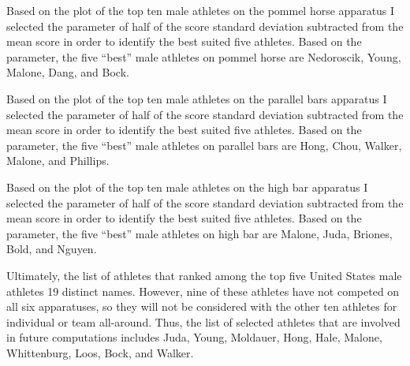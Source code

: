 \documentclass[12pt]{article}
\begin{document}
Based on the plot of the top ten male athletes on the pommel horse apparatus I selected the parameter of 
half of the score standard deviation subtracted from the mean score in order to identify the best suited five 
athletes. Based on the parameter, the five ``best'' male athletes on pommel horse are Nedoroscik, Young, Malone, 
Dang, and Bock.

Based on the plot of the top ten male athletes on the parallel bars apparatus I selected the parameter of 
half of the score standard deviation subtracted from the mean score in order to identify the best suited five 
athletes. Based on the parameter, the five ``best'' male athletes on parallel bars are Hong, Chou, Walker, Malone, 
and Phillips.

Based on the plot of the top ten male athletes on the high bar apparatus I selected the parameter of 
half of the score standard deviation subtracted from the mean score in order to identify the best suited five 
athletes. Based on the parameter, the five ``best'' male athletes on high bar are Malone, Juda, Briones, Bold, and 
Nguyen.

Ultimately, the list of athletes that ranked among the top five United States male athletes 19 distinct 
names. However, nine of these athletes have not competed on all six apparatuses, so they will not be considered 
with the other ten athletes for individual or team all-around. Thus, the list of selected athletes that 
are involved in future computations includes Juda, Young, Moldauer, Hong, Hale, Malone, Whittenburg, Loos, 
Bock, and Walker.




\end{document}
